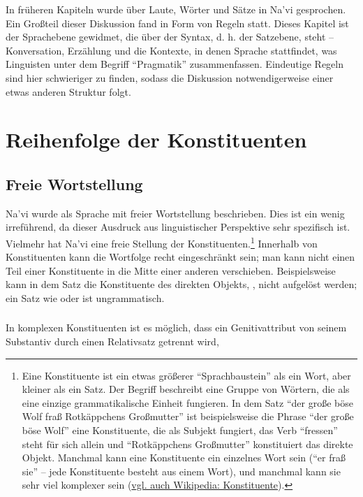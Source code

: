 
\noindent In früheren Kapiteln wurde über Laute, Wörter und Sätze in Na'vi gesprochen. Ein Großteil dieser Diskussion fand in Form von Regeln statt. Dieses Kapitel ist der Sprachebene gewidmet, die über der Syntax, d. h. der Satzebene, steht -- Konversation, Erzählung und die Kontexte, in denen Sprache stattfindet, was Linguisten unter dem Begriff ``Pragmatik'' zusammenfassen. Eindeutige Regeln sind hier schwieriger zu finden, sodass die Diskussion notwendigerweise einer etwas anderen Struktur folgt.


\section{Reihenfolge der Konstituenten}

\subsection{Freie Wortstellung} Na'vi wurde als Sprache mit freier Wortstellung beschrieben. Dies ist ein wenig irreführend, da dieser Ausdruck aus linguistischer Perspektive sehr spezifisch ist. Vielmehr hat Na'vi eine freie Stellung der Konstituenten.\footnote{Eine Konstituente ist ein etwas größerer ``Sprachbaustein'' als ein Wort, aber kleiner als ein Satz. Der Begriff beschreibt eine Gruppe von Wörtern, die als eine einzige grammatikalische Einheit fungieren. In dem Satz ``der große böse Wolf fraß Rotkäppchens Großmutter'' ist beispielsweise die Phrase ``der große böse Wolf'' eine Konstituente, die als Subjekt fungiert, das Verb ``fressen'' steht für sich allein und ``Rotkäppchens Großmutter'' konstituiert das direkte Objekt. Manchmal kann eine Konstituente ein einzelnes Wort sein (``er fraß sie'' -- jede Konstituente besteht aus einem Wort), und manchmal kann sie sehr viel komplexer sein (\href{https://de.wikipedia.org/wiki/Konstituente}{vgl. auch Wikipedia: Konstituente}).} Innerhalb von Konstituenten kann die Wortfolge recht eingeschränkt sein; man kann nicht einen Teil einer Konstituente in die Mitte einer anderen verschieben. Beispielsweise kann in dem Satz   die Konstituente des direkten Objekts, , nicht aufgelöst werden; ein Satz wie  oder  ist ungrammatisch.

\subsubsection{} In komplexen Konstituenten ist es möglich, dass ein Genitivattribut von seinem Substantiv durch einen Relativsatz getrennt wird, 

